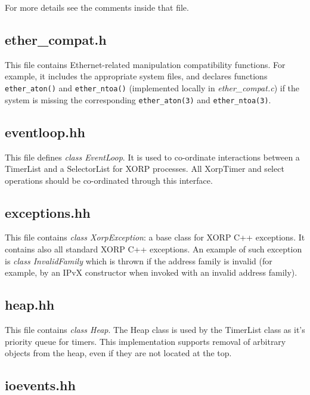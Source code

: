 \documentclass[11pt]{article}
\begin{document}
For more details see the comments inside that file.

\subsection{ether\_compat.h}

This file contains Ethernet-related manipulation compatibility
functions. For example, it includes the appropriate system files,
and declares functions \verb=ether_aton()= and \verb=ether_ntoa()=
(implemented locally in \emph{ether\_compat.c}) if the system is missing
the corresponding \verb=ether_aton(3)= and \verb=ether_ntoa(3)=.

\subsection{eventloop.hh}

This file defines \emph{class EventLoop}.
It is used to co-ordinate interactions between a TimerList and a
SelectorList for XORP processes.  All XorpTimer and select operations
should be co-ordinated through this interface.

\subsection{exceptions.hh}

This file contains \emph{class XorpException}: a base class for XORP C++
exceptions. It contains also all standard XORP C++ exceptions.
An example of such exception is \emph{class InvalidFamily} which is
thrown if the address family is invalid (for example, by an IPvX
constructor when invoked with an invalid address family).

\subsection{heap.hh}

This file contains \emph{class Heap}.  The Heap class is used by the
TimerList class as it's priority queue for timers. This implementation
supports removal of arbitrary objects from the heap, even if they are
not located at the top.

\subsection{ioevents.hh}
\end{document}
